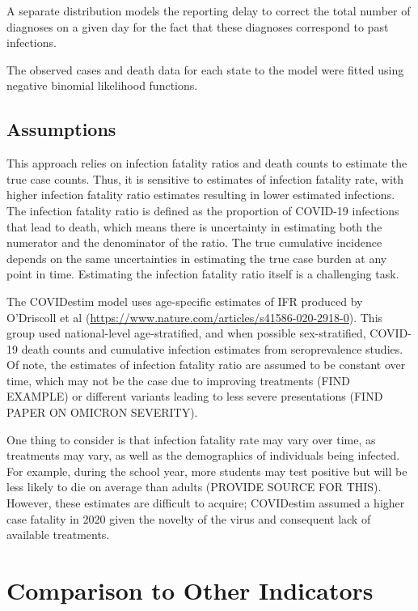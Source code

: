 \documentclass[12pt,twoside]{smiththesis}
\begin{document}
A separate distribution models the reporting delay to correct the total number of diagnoses on a given day for the fact that these diagnoses correspond to past infections.

The observed cases and death data for each state to the model were fitted using negative binomial likelihood functions.

\hypertarget{assumptions}{%
\subsection{Assumptions}\label{assumptions}}

This approach relies on infection fatality ratios and death counts to estimate the true case counts. Thus, it is sensitive to estimates of infection fatality rate, with higher infection fatality ratio estimates resulting in lower estimated infections. The infection fatality ratio is defined as the proportion of COVID-19 infections that lead to death, which means there is uncertainty in estimating both the numerator and the denominator of the ratio. The true cumulative incidence depends on the same uncertainties in estimating the true case burden at any point in time. Estimating the infection fatality ratio itself is a challenging task.

The COVIDestim model uses age-specific estimates of IFR produced by O'Driscoll et al (\url{https://www.nature.com/articles/s41586-020-2918-0}). This group used national-level age-stratified, and when possible sex-stratified, COVID-19 death counts and cumulative infection estimates from seroprevalence studies. Of note, the estimates of infection fatality ratio are assumed to be constant over time, which may not be the case due to improving treatments (FIND EXAMPLE) or different variants leading to less severe presentations (FIND PAPER ON OMICRON SEVERITY).

One thing to consider is that infection fatality rate may vary over time, as treatments may vary, as well as the demographics of individuals being infected. For example, during the school year, more students may test positive but will be less likely to die on average than adults (PROVIDE SOURCE FOR THIS). However, these estimates are difficult to acquire; COVIDestim assumed a higher case fatality in 2020 given the novelty of the virus and consequent lack of available treatments.

\hypertarget{comparison-to-other-indicators}{%
\section{Comparison to Other Indicators}\label{comparison-to-other-indicators}}
\end{document}
